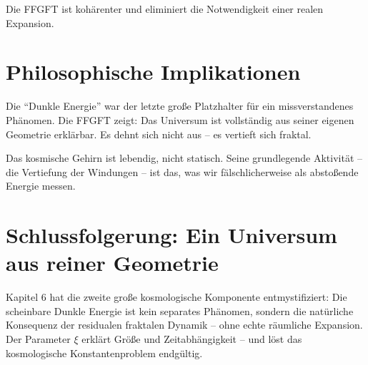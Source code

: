\begin{center}
	\small
\end{center}
	
	Die FFGFT ist kohärenter und eliminiert die Notwendigkeit einer realen Expansion.
	
	\section{Philosophische Implikationen}
	
	Die \enquote{Dunkle Energie} war der letzte große Platzhalter für ein missverstandenes Phänomen. Die FFGFT zeigt: Das Universum ist vollständig aus seiner eigenen Geometrie erklärbar. Es dehnt sich nicht aus – es vertieft sich fraktal.
	
	Das kosmische Gehirn ist lebendig, nicht statisch. Seine grundlegende Aktivität – die Vertiefung der Windungen – ist das, was wir fälschlicherweise als abstoßende Energie messen.
	
	\section{Schlussfolgerung: Ein Universum aus reiner Geometrie}
	
	Kapitel 6 hat die zweite große kosmologische Komponente entmystifiziert: Die scheinbare Dunkle Energie ist kein separates Phänomen, sondern die natürliche Konsequenz der residualen fraktalen Dynamik – ohne echte räumliche Expansion. Der Parameter \(\xi\) erklärt Größe und Zeitabhängigkeit – und löst das kosmologische Konstantenproblem endgültig.
	
